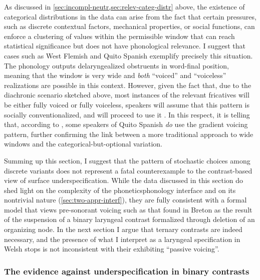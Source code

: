 As discussed in \cref{sec:incompl-neutr,sec:relev-categ-distr} above, the existence of categorical distributions in the data can arise from the fact that certain pressures, such as discrete contextual factors, mechanical properties, or social functions, can enforce a clustering of values within the permissible window that can reach statistical significance but does not have phonological relevance. I suggest that cases such as West Flemish and Quito Spanish exemplify precisely this situation. The phonology outputs delaryngealized obstruents in word\hyp final position, meaning that the window is very wide and \emph{both} \enquote{voiced} and \enquote{voiceless} realizations are possible in this context. However, given the fact that, due to the diachronic scenario sketched above, most instances of the relevant fricatives will be either fully voiced or fully voiceless, speakers will assume that this pattern is socially conventionalized, and will proceed to use it \citep[\cfm][]{carr00:_scien,uffmann10}. In this respect, it is telling that, according to \citet{strycharczuk11:_phonet}, some speakers of Quito Spanish \emph{do} use the gradient voicing pattern, further confirming the link between a more traditional approach to wide windows and the categorical\hyp but\hyp optional variation.

Summing up this section, I suggest that the pattern of stochastic choices among discrete variants does not represent a fatal counterexample to the contrast\hyp based view of surface underspecification. While the data discussed in this section do shed light on the complexity of the phonetics\endash phonology interface and on its nontrivial nature (\cref{sec:two-appr-interf}), they are fully consistent with a formal model that views pre\hyp sonorant voicing such as that found in Breton as the result of the suspension of a binary laryngeal contrast formalized through deletion of an organizing node. In the next section I argue that ternary contrasts are indeed necessary, and the presence of what I interpret as a laryngeal specification in Welsh stops is not inconsistent with their exhibiting \enquote{passive voicing}.

\subsubsection{The evidence against underspecification in binary contrasts}
\label{sec:evid-against-binary}

